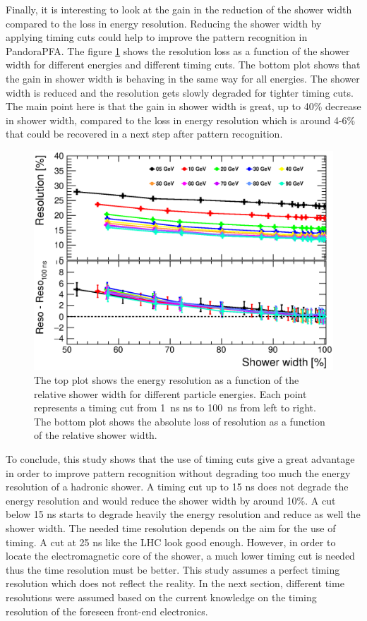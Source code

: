 Finally, it is interesting to look at the gain in the reduction of the shower width compared to the loss in energy resolution. Reducing the shower width by applying timing cuts could help to improve the pattern recognition in PandoraPFA. The figure \ref{fig:ShowerWidthResoNoSmearing} shows the resolution loss as a function of the shower width for different \kzeroL{} energies and different timing cuts. The bottom plot shows that the gain in shower width is behaving in the same way for all energies. The shower width is reduced and the resolution gets slowly degraded for tighter timing cuts. The main point here is that the gain in shower width is great, up to 40\% decrease in shower width, compared to the loss in energy resolution which is around 4-6\% that could be recovered in a next step after pattern recognition.

\begin{figure}[htbp!]
  \centering
  \includegraphics[width=0.6\linewidth]{../Thesis_Plots/ILD/NoSmearing/Plots/ShowerWidth_Resolution_noSmearing.eps}
  \caption{The top plot shows the energy resolution as a function of the relative shower width for different particle energies. Each point represents a timing cut from \SI{1}{\nano\second} ns to \SI{100}{\nano\second} from left to right. The bottom plot shows the absolute loss of resolution as a function of the relative shower width.} \label{fig:ShowerWidthResoNoSmearing}
\end{figure}

To conclude, this study shows that the use of timing cuts give a great advantage in order to improve pattern recognition without degrading too much the energy resolution of a hadronic shower. A timing cut up to 15 ns does not degrade the energy resolution and would reduce the shower width by around 10\%. A cut below 15 ns starts to degrade heavily the energy resolution and reduce as well the shower width. The needed time resolution depends on the aim for the use of timing. A cut at 25 ns like the LHC look good enough. However, in order to locate the electromagnetic core of the shower, a much lower timing cut is needed thus the time resolution must be better. This study assumes a perfect timing resolution which does not reflect the reality. In the next section, different time resolutions were assumed based on the current knowledge on the timing resolution of the foreseen front-end electronics.

